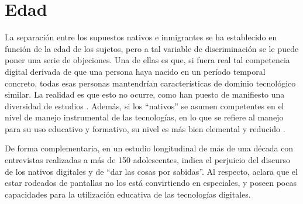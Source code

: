 \documentclass[spanish]{textolivre}
\begin{document}
\section{Edad}
La separación entre los supuestos nativos e inmigrantes se ha establecido en función de la edad de los sujetos, pero a tal variable de discriminación se le puede poner una serie de objeciones. Una de ellas es que, si fuera real tal competencia digital derivada de que una persona haya nacido en un período temporal concreto, todas esas personas mantendrían características de dominio tecnológico similar. La realidad es que esto no ocurre, como han puesto de manifiesto una diversidad de estudios \cite{romero-rodriguez_media_2019, desmurget_fabrica_2020}. Además, si los “nativos” se asumen competentes en el nivel de manejo instrumental de las tecnologías, en lo que se refiere al manejo para su uso educativo y formativo, su nivel es más bien elemental y reducido \cite{desmurget_fabrica_2020}.

De forma complementaria, en un estudio longitudinal de más de una década con entrevistas realizadas a más de 150 adolescentes, \textcite{boyd_its_2014} indica el perjuicio del discurso de los nativos digitales y de “dar las cosas por sabidas”. Al respecto, aclara que el estar rodeados de pantallas no los está convirtiendo en especiales, y poseen pocas capacidades para la utilización educativa de las tecnologías digitales. 
\end{document}
